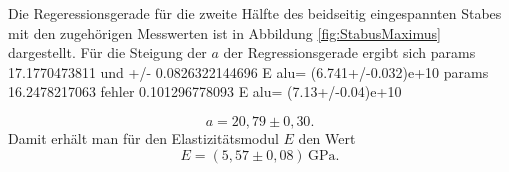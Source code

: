 Die Regeressionsgerade für die zweite Hälfte des beidseitig eingespannten Stabes  mit den
zugehörigen Messwerten ist in Abbildung \ref{fig:StabusMaximus} dargestellt.
Für die Steigung der $a$ der Regressionsgerade ergibt sich
params 17.1770473811 und +/- 0.0826322144696
E alu= (6.741+/-0.032)e+10
params 16.2478217063 fehler 0.101296778093
E alu= (7.13+/-0.04)e+10

\begin{equation*}
	a = 20,79 \pm 0,30  \mathrm{.}
\end{equation*}
Damit erhält man für den Elastizitätsmodul $E$ den Wert
\begin{equation*}
	E = (5,57 \pm 0,08) \, \si{\giga\pascal} \mathrm{.}
\end{equation*}

